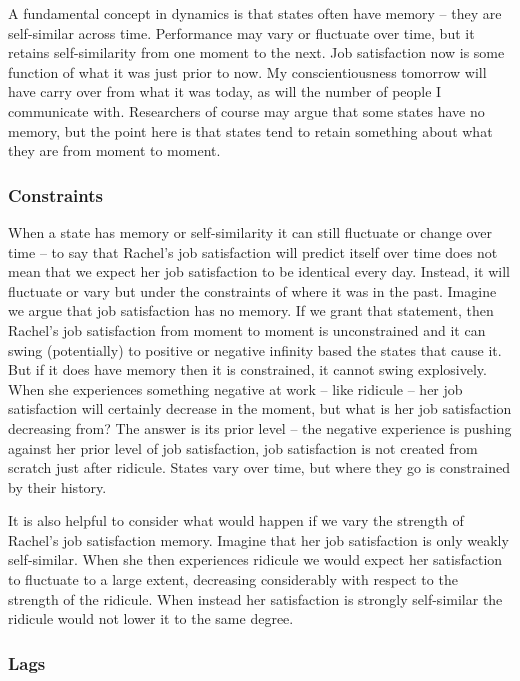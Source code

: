 \documentclass[english,,man]{apa6}
\theoremstyle{definition}
\theoremstyle{definition}
\theoremstyle{definition}
\theoremstyle{remark}
\begin{document}
A fundamental concept in dynamics is that states often have memory --
they are self-similar across time. Performance may vary or fluctuate
over time, but it retains self-similarity from one moment to the next.
Job satisfaction now is some function of what it was just prior to now.
My conscientiousness tomorrow will have carry over from what it was
today, as will the number of people I communicate with. Researchers of
course may argue that some states have no memory, but the point here is
that states tend to retain something about what they are from moment to
moment.

\hypertarget{constraints}{%
\subsubsection{Constraints}\label{constraints}}

When a state has memory or self-similarity it can still fluctuate or
change over time -- to say that Rachel's job satisfaction will predict
itself over time does not mean that we expect her job satisfaction to be
identical every day. Instead, it will fluctuate or vary but under the
constraints of where it was in the past. Imagine we argue that job
satisfaction has no memory. If we grant that statement, then Rachel's
job satisfaction from moment to moment is unconstrained and it can swing
(potentially) to positive or negative infinity based the states that
cause it. But if it does have memory then it is constrained, it cannot
swing explosively. When she experiences something negative at work --
like ridicule -- her job satisfaction will certainly decrease in the
moment, but what is her job satisfaction decreasing from? The answer is
its prior level -- the negative experience is pushing against her prior
level of job satisfaction, job satisfaction is not created from scratch
just after ridicule. States vary over time, but where they go is
constrained by their history.

It is also helpful to consider what would happen if we vary the strength
of Rachel's job satisfaction memory. Imagine that her job satisfaction
is only weakly self-similar. When she then experiences ridicule we would
expect her satisfaction to fluctuate to a large extent, decreasing
considerably with respect to the strength of the ridicule. When instead
her satisfaction is strongly self-similar the ridicule would not lower
it to the same degree.

\hypertarget{lags}{%
\subsubsection{Lags}\label{lags}}
\end{document}

